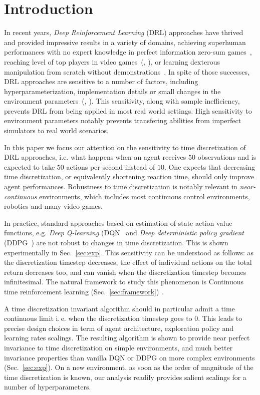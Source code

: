 
\section{Introduction}
\label{sec:intro}
In recent years, \emph{Deep Reinforcement Learning} (DRL) approaches have
thrived and provided impressive results in a variety of domains, achieving superhuman
performances with no expert knowledge in perfect information zero-sum
games~\cite{alphazero}, reaching level of top players in video
games~(\citealt{openai_five}, \citealt{dqn}), or learning dexterous manipulation
from scratch without demonstrations~\cite{hand_control}. 
In spite of those successes, DRL approaches are
sensitive to a number of factors, including hyperparameterization,
implementation details or small changes in the environment
parameters~(\citealt{drl_matter}, \citealt{drl_matter_bis}). This sensitivity,
along with sample inefficiency, prevents DRL from being applied in most real
world settings. High sensitivity to environment parameters notably prevents
transfering abilities from imperfect simulators to real world scenarios.

In this paper we focus our attention on the sensitivity to time discretization
of DRL approaches,
i.e. what happens when an agent receives $50$ observations
and is expected to take $50$ actions per second instead of $10$. One expects
that decreasing time discretization, or equivalently shortening reaction time,
should only improve agent performances. Robustness to time discretization is notably relevant in \emph{near-continuous}
environments, which includes most continuous control environments, robotics and many video games.

In practice, standard approaches based on estimation of state action value functions, e.g.
\emph{Deep Q-learning} (DQN~\citep{dqn} and \emph{Deep deterministic policy
gradient} (DDPG~\citep{ddpg}) are not robust to changes in time discretization. This is shown experimentally in Sec.~\ref{sec:exp}. 
This sensitivity can be understood as follows: as the discretization timestep
decreases, the effect of individual actions on the total return decreases too, and
can vanish when the discretization timestep becomes infinitesimal. The natural
framework to study this phenomenon is Continuous time reinforcement learning 
(Sec.~\ref{sec:framework}) \cite{cont_rl, adv_upd}.

A time discretization invariant algorithm should
in particular admit a time continuous limit i.\,e. when the discretization timestep goes to $0$.
This leads to precise design choices in term of
agent architecture, exploration policy and learning rates scalings.
The resulting algorithm is shown to provide near perfect invariance to time
discretization on simple environments, and much better invariance properties
than vanilla DQN or DDPG on more complex environments (Sec.~\ref{sec:exp}).
On a new environment, as soon as the order of magnitude of the time discretization is known, our analysis readily provides salient scalings for a number of hyperparameters.


